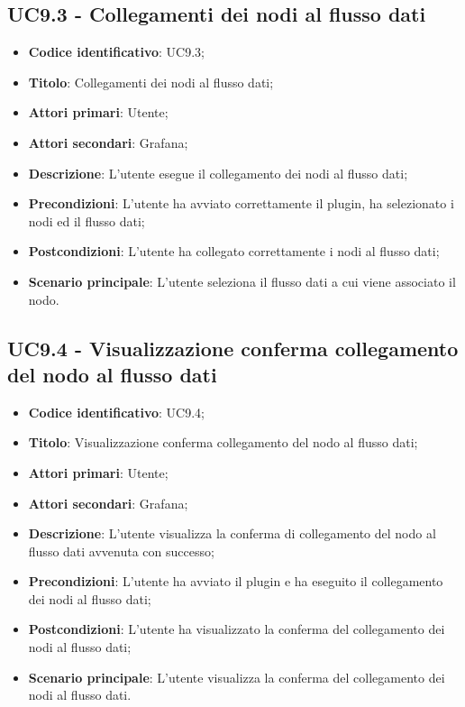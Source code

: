 \subsection{UC9.3 - Collegamenti dei nodi al flusso dati}
\begin{itemize}
	\item \textbf{Codice identificativo}: UC9.3;
	\item \textbf{Titolo}: Collegamenti dei nodi al flusso dati;
	\item \textbf{Attori primari}: Utente;
	\item \textbf{Attori secondari}: Grafana\glo;
	\item \textbf{Descrizione}: L'utente esegue il collegamento dei nodi al flusso dati;
	\item \textbf{Precondizioni}: L'utente ha avviato correttamente il plugin, ha selezionato i nodi ed il flusso dati;
	\item \textbf{Postcondizioni}: L'utente ha collegato correttamente i nodi al flusso dati;
	\item \textbf{Scenario principale}: L'utente seleziona il flusso dati a cui viene associato il nodo.
\end{itemize}

\subsection{UC9.4 - Visualizzazione conferma collegamento del nodo al flusso dati}
\begin{itemize}
	\item \textbf{Codice identificativo}: UC9.4;
	\item \textbf{Titolo}: Visualizzazione conferma collegamento del nodo al flusso dati;
	\item \textbf{Attori primari}: Utente;
	\item \textbf{Attori secondari}: Grafana\glo;
	\item \textbf{Descrizione}: L'utente visualizza la conferma di collegamento del nodo al flusso dati avvenuta con successo;
	\item \textbf{Precondizioni}: L'utente ha avviato il plugin e ha eseguito il collegamento dei nodi al flusso dati;
	\item \textbf{Postcondizioni}: L'utente ha visualizzato la conferma del collegamento dei nodi al flusso dati;
	\item \textbf{Scenario principale}: L'utente visualizza la conferma del collegamento dei nodi al flusso dati.
\end{itemize}